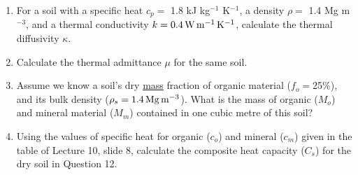 \documentclass[11pt]{article}
\begin{document}
\begin{enumerate}
\item For a soil with a specific heat $c_p =$ 1.8 kJ kg$^{-1}$ K$^{-1}$, a density $\rho =$ 1.4 Mg m$^{-3}$, and a thermal conductivity $k = 0.4\,\rm{W}\,\rm{m}^{-1}\,\rm{K}^{-1}$, calculate the thermal diffusivity $\kappa$.

\item Calculate the thermal admittance $\mu$ for the same soil.

\item Assume we know a soil's dry \underline{mass} fraction of organic material ($f_o = $25\%), and its bulk density ($\rho_s = 1.4 \,\rm{Mg}\,\rm{m}^{-3}$). What is the mass of organic ($M_o$) and mineral material ($M_m$) contained in one cubic metre of this soil?

\item Using the values of specific heat for organic ($c_o$) and mineral ($c_m$) given in the table of Lecture 10, slide 8, calculate the composite heat capacity ($C_s$) for the dry soil in Question 12.

\end{enumerate}
\end{document}

